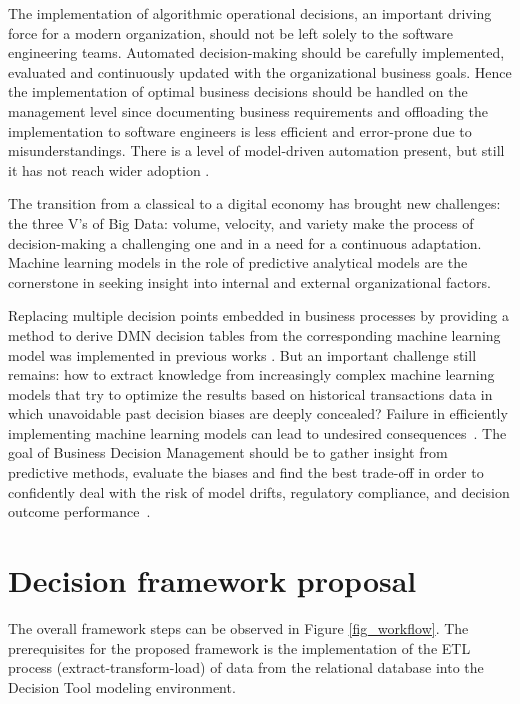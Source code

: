 \documentclass[runningheads]{llncs}
\begin{document}
The implementation of algorithmic operational decisions, an important driving force for a modern organization, should not be left solely to the software engineering teams. Automated decision-making should be carefully implemented, evaluated and continuously updated with the organizational business goals.
Hence the implementation of optimal business decisions should be handled on the management level since documenting business requirements and offloading the implementation to software engineers is less efficient and error-prone due to misunderstandings. There is a level of model-driven automation present, but still it has not reach wider adoption \cite{tankovic2012rethinking}.

The transition from a classical to a digital economy has brought new challenges: the three V's of Big Data: volume, velocity, and variety make the process of decision-making a challenging one and in a need for a continuous adaptation. Machine learning models in the role of predictive analytical models are the cornerstone in seeking insight into internal and external organizational factors.

Replacing multiple decision points embedded in business processes by providing a method to derive DMN decision tables from the corresponding machine learning model was implemented in previous works \cite{Etinger_2019}. But an important challenge still remains: how to extract knowledge from increasingly complex machine learning models that try to optimize the results based on historical transactions data in which unavoidable past decision biases are deeply concealed? Failure in efficiently implementing machine learning models can lead to undesired consequences~\cite{Dressel_2018}.  The goal of Business Decision Management should be to gather insight from predictive methods, evaluate the biases and find the best trade-off in order to confidently deal with the risk of model drifts, regulatory compliance, and decision outcome performance~\cite{DMN_book}.


\section{Decision framework proposal}
\label{sec_proposal}

The overall framework steps can be observed in Figure \ref{fig_workflow}. The prerequisites for the proposed framework is the implementation of the ETL process (extract-transform-load) of data from the relational database into the Decision Tool modeling environment. 
\end{document}
